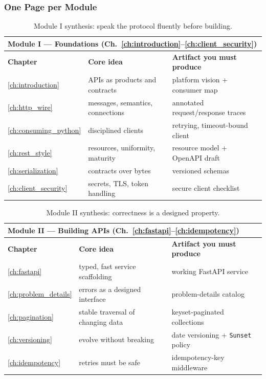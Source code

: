 \subsubsection{One Page per Module}

\begin{table}[htbp]
  \centering
  \small
  \begin{tabularx}{\textwidth}{l X X}
    \toprule
    \multicolumn{3}{l}{\textbf{Module I --- Foundations (Ch.~\ref{ch:introduction}--\ref{ch:client_security})}} \\
    \midrule
    \textbf{Chapter} & \textbf{Core idea} & \textbf{Artifact you must produce} \\
    \midrule
    \ref{ch:introduction} & APIs as products and contracts & platform vision + consumer map \\
    \ref{ch:http_wire} & messages, semantics, connections \cite{rfc9110,rfc9112,rfc9113} & annotated request/response traces \\
    \ref{ch:consuming_python} & disciplined clients & retrying, timeout-bound client \cite{httpxdocs,requestsdocs} \\
    \ref{ch:rest_style} & resources, uniformity, maturity \cite{fielding2000rest,richardson2013restful} & resource model + OpenAPI draft \\
    \ref{ch:serialization} & contracts over bytes \cite{rfc8259,jsonschemadocs} & versioned schemas \\
    \ref{ch:client_security} & secrets, TLS, token handling \cite{rfc8446,rfc7636} & secure client checklist \\
    \bottomrule
  \end{tabularx}
  \caption{Module I synthesis: speak the protocol fluently before building.}
  \label{tab:module1}
\end{table}

\begin{table}[htbp]
  \centering
  \small
  \begin{tabularx}{\textwidth}{l X X}
    \toprule
    \multicolumn{3}{l}{\textbf{Module II --- Building APIs (Ch.~\ref{ch:fastapi}--\ref{ch:idempotency})}} \\
    \midrule
    \textbf{Chapter} & \textbf{Core idea} & \textbf{Artifact you must produce} \\
    \midrule
    \ref{ch:fastapi} & typed, fast service scaffolding \cite{fastapidocs,pydanticdocs} & working FastAPI service \\
    \ref{ch:problem_details} & errors as a designed interface \cite{rfc9457} & problem-details catalog \\
    \ref{ch:pagination} & stable traversal of changing data \cite{rfc8288} & keyset-paginated collections \\
    \ref{ch:versioning} & evolve without breaking & date versioning + \texttt{Sunset} policy \cite{rfc8594} \\
    \ref{ch:idempotency} & retries must be safe & idempotency-key middleware \\
    \bottomrule
  \end{tabularx}
  \caption{Module II synthesis: correctness is a designed property.}
  \label{tab:module2}
\end{table}

